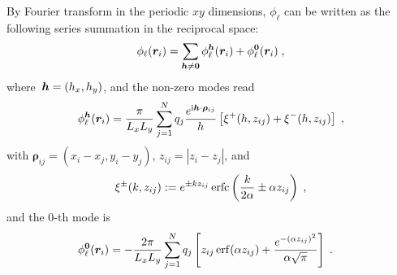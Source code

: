 \begin{lem}\label{thm::SpectralExpansion}
	By Fourier transform in the periodic $xy$ dimensions, $\phi_{\ell}$ can be written as the following series summation in the reciprocal space:
	\begin{equation}\label{eq::7} 
		\phi_{\ell}(\bm{r}_{i}) = \sum_{\boldsymbol{h} \neq \bm{0}} \phi_{\ell}^{\boldsymbol{h}}(\bm{r}_{i}) + \phi_{\ell}^{\bm{0}}(\bm{r}_{i})\;,
	\end{equation}
	where~$\boldsymbol{h} = (h_x, h_y)$, and the non-zero modes read
	\begin{equation}\label{eq:philk}
		\phi_{\ell}^{\boldsymbol{h}}(\bm{r}_{i}) = \frac{\pi}{L_x L_y} \sum_{j = 1}^N q_{j} \frac{e^{\mathrm{i} \boldsymbol{h} \cdot \boldsymbol{\rho}_{ij}}}{h} \left[\xi^{+}(h, z_{ij})+\xi^{-}(h, z_{ij})\right]\;,
	\end{equation}
	with $\bm{\rho}_{ij}=(x_{i}-x_{j},y_{i}-y_{j})$, $z_{ij}=|z_{i}-z_{j}|$, and
	\begin{equation}\label{eq::9}
		\xi^{\pm}(k, z_{ij}) := e^{\pm k z_{ij}} \operatorname{erfc} \left( \frac{k}{2 \alpha} \pm \alpha z_{ij}\right)\;,
	\end{equation} 
	and the 0-th mode is
	\begin{align}\label{eq:phil0}
		\phi_{\ell}^{\bm{0}}(\bm{r}_{i}) &= -\frac{2\pi}{L_x L_y} \sum_{j = 1}^N q_{j} \left[ {z_{ij}} \operatorname{erf}(\alpha {z_{ij}}) + \frac{e^{-(\alpha z_{ij})^2}}{\alpha \sqrt{\pi}}  \right]\;.
	\end{align}
\end{lem}

